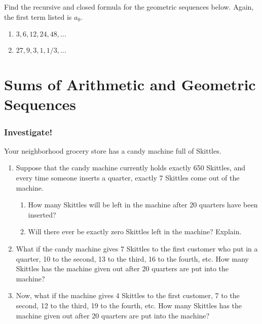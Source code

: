 \documentclass[11pt, compress]{beamer}
\begin{document}
\begin{frame}
\frametitle{}
\begin{example}[2.2.2]Find the recursive and closed formula for the geometric sequences below. Again, the first term listed is \(a_0\).\begin{enumerate}
\item{} \(\displaystyle 3, 6, 12, 24, 48, \ldots\)

\item{} \(\displaystyle 27, 9, 3, 1, 1/3, \ldots\)
\end{enumerate}

\end{example}
\end{frame}
 


\section{Sums of Arithmetic and Geometric Sequences}
\begin{frame}
\frametitle{Investigate!}
 Your neighborhood grocery store has a candy machine full of Skittles.\begin{enumerate}
\item{} Suppose that the candy machine currently holds exactly 650 Skittles, and every time someone inserts a quarter, exactly 7 Skittles come out of the machine.\begin{enumerate}
\item{} How many Skittles will be left in the machine after 20 quarters have been inserted?


\item{} Will there ever be exactly zero Skittles left in the machine? Explain.

\end{enumerate}



\item{} What if the candy machine gives 7 Skittles to the first customer who put in a quarter, 10 to the second, 13 to the third, 16 to the fourth, etc. How many Skittles has the machine given out after 20 quarters are put into the machine?


\item{} Now, what if the machine gives 4 Skittles to the first customer, 7 to the second, 12 to the third, 19 to the fourth, etc. How many Skittles has the machine given out after 20 quarters are put into the machine?

\end{enumerate}

\end{frame}
 
\end{document}
